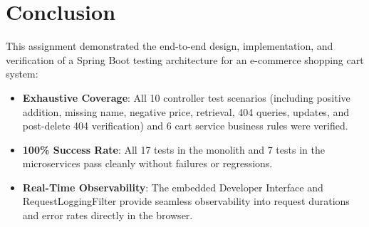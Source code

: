 \documentclass[12pt,a4paper]{article}
\begin{document}
\section{Conclusion}

This assignment demonstrated the end-to-end design, implementation, and verification of a Spring Boot testing architecture for an e-commerce shopping cart system:
\begin{itemize}[leftmargin=2em]
  \item \textbf{Exhaustive Coverage}: All 10 controller test scenarios (including positive addition, missing name, negative price, retrieval, 404 queries, updates, and post-delete 404 verification) and 6 cart service business rules were verified.
  \item \textbf{100\% Success Rate}: All 17 tests in the monolith and 7 tests in the microservices pass cleanly without failures or regressions.
  \item \textbf{Real-Time Observability}: The embedded Developer Interface and RequestLoggingFilter provide seamless observability into request durations and error rates directly in the browser.
\end{itemize}
\end{document}
